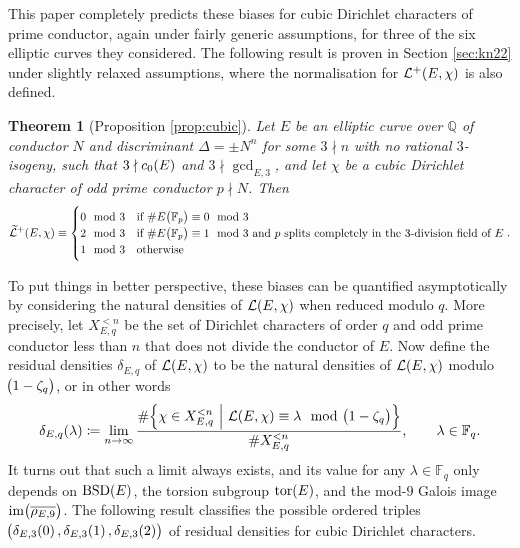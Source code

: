 \documentclass{article}
\theoremstyle{plain}
\newtheorem{theorem}[n]{Theorem}
\theoremstyle{definition}
\newcommand{\BSD}{\operatorname{BSD}}
\newcommand{\FF}{\mathbb{F}}
\newcommand{\im}{\operatorname{im}}
\newcommand{\LLL}{\mathcal{L}}
\newcommand{\QQ}{\mathbb{Q}}
\newcommand{\tor}{\operatorname{tor}}
\newcommand{\br}{\!\del}
\newcommand{\st}{\ \middle| \ }
\begin{document}
This paper completely predicts these biases for cubic Dirichlet characters of prime conductor, again under fairly generic assumptions, for three of the six elliptic curves they considered. The following result is proven in Section \ref{sec:kn22} under slightly relaxed assumptions, where the normalisation for $ \LLL^+\br{E, \chi} $ is also defined.

\begin{theorem}[Proposition \ref{prop:cubic}]
Let $ E $ be an elliptic curve over $ \QQ $ of conductor $ N $ and discriminant $ \Delta = \pm N^n $ for some $ 3 \nmid n $ with no rational $ 3 $-isogeny, such that $ 3 \nmid c_0\br{E} $ and $ 3 \nmid \gcd_{E, 3} $, and let $ \chi $ be a cubic Dirichlet character of odd prime conductor $ p \nmid N $. Then
$$ \widetilde{\LLL}^+\br{E, \chi} \equiv
\begin{cases}
0 \mod 3 & \text{if} \ \#E\br{\FF_p} \equiv 0 \mod 3 \\
2 \mod 3 & \text{if} \ \#E\br{\FF_p} \equiv 1 \mod 3 \ \text{and} \ p \ \text{splits completely in the $ 3 $-division field of} \ E \\
1 \mod 3 & \text{otherwise}
\end{cases}.
$$
\end{theorem}

To put things in better perspective, these biases can be quantified asymptotically by considering the natural densities of $ \LLL\br{E, \chi} $ when reduced modulo $ q $. More precisely, let $ X_{E, q}^{< n} $ be the set of Dirichlet characters of order $ q $ and odd prime conductor less than $ n $ that does not divide the conductor of $ E $. Now define the residual densities $ \delta_{E, q} $ of $ \LLL\br{E, \chi} $ to be the natural densities of $ \LLL\br{E, \chi} $ modulo $ \br{1 - \zeta_q} $, or in other words
$$ \delta_{E, q}\br{\lambda} \coloneqq \lim_{n \to \infty} \dfrac{\#\cbr{\chi \in X_{E, q}^{< n} \st \LLL\br{E, \chi} \equiv \lambda \mod \br{1 - \zeta_q}}}{\#X_{E, q}^{< n}}, \qquad \lambda \in \FF_q. $$
It turns out that such a limit always exists, and its value for any $ \lambda \in \FF_q $ only depends on $ \BSD\br{E} $, the torsion subgroup $ \tor\br{E} $, and the mod-$ 9 $ Galois image $ \im\br{\overline{\rho_{E, 9}}} $. The following result classifies the possible ordered triples $ \br{\delta_{E, 3}\br{0}, \delta_{E, 3}\br{1}, \delta_{E, 3}\br{2}} $ of residual densities for cubic Dirichlet characters.

\pagebreak
\end{document}
